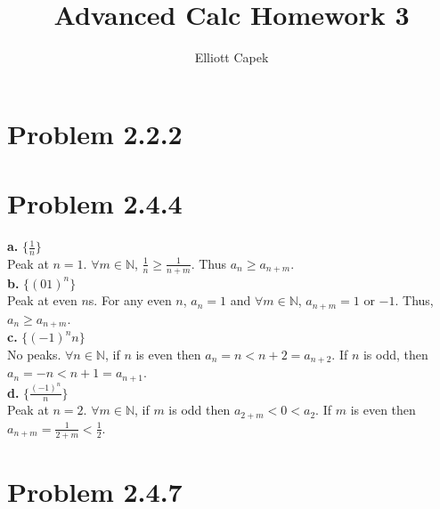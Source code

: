 \documentclass[10pt]{article} %
\title{Advanced Calc Homework 3}
\author{Elliott Capek}
\begin{document}
\maketitle{}

\section{Problem 2.2.2}


\section{Problem 2.4.4}
\textbf{a.} $\{\frac{1}{n}\}$\\
Peak at $n=1$. $\forall m \in \mathbb{N}$, $\frac{1}{n} \geq \frac{1}{n+m}$. Thus $a_n \geq a_{n+m}$.\\

\textbf{b.} $\{\left(01\right)^n\}$\\
Peak at even $n$s. For any even $n$, $a_n = 1$ and $\forall m \in \mathbb{N}$, $a_{n+m} = 1$ or $-1$. Thus, $a_n \geq a_{n+m}$.\\

\textbf{c.} $\{(-1)^nn\}$\\
No peaks. $\forall n \in \mathbb{N}$, if $n$ is even then $a_n = n < n+2 = a_{n+2}$. If $n$ is odd, then $a_n = -n < n+1 = a_{n+1}$.\\

\textbf{d.} $\{\frac{(-1)^n}{n}\}$\\
Peak at $n=2$. $\forall m \in \mathbb{N}$, if $m$ is odd then $a_{2+m} < 0 < a_{2}$. If $m$ is even then $a_{n+m} = \frac{1}{2+m} < \frac{1}{2}$.\\

\section{Problem 2.4.7}
\end{document}
